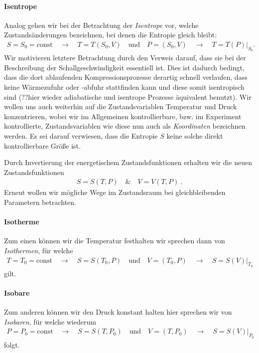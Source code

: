 \paragraph*{Isentrope}
Analog gehen wir bei der Betrachtung der \emph{Isentrope} vor, welche Zustandsänderungen bezeichnen, bei denen die Entropie gleich bleibt: 
\begin{align*}
    S=S_0=\mathrm{const}\quad\rightarrow\quad T=T(S_0,V) \quad\text{und}\quad P=(S_0,V) \quad\rightarrow\quad T=T(P)|_{S_0}.
\end{align*}
Wir motivieren letztere Betrachtung durch den Verweis darauf, dass sie bei der Beschreibung der Schallgeschwindigkeit essentiell ist. Dies ist dadurch bedingt, dass die dort ablaufenden Kompressionsprozesse derartig schnell verlaufen, dass keine Wärmezufuhr oder -abfuhr stattfinden kann und diese somit isentropisch sind (??hier wieder adiabatische und isentrope Prozesse äquivalent benutzt).
Wir wollen uns auch weiterhin auf die Zustandsvariablen Temperatur und Druck konzentrieren, wobei wir im Allgemeinen kontrollierbare, bzw. im Experiment kontrollierte, Zustandsvariablen \textendash{} wie diese \textendash{} nun auch als \emph{Koordinaten} bezeichnen werden. Es sei darauf verwiesen, dass die Entropie $S$ keine solche direkt kontrollierbare Größe ist.

Durch Invertierung der energetischem Zustandsfunktionen erhalten wir die neuen Zustandsfunktionen 
\begin{align*}
    \boxed{S=S(T,P) \quad\&\quad V=V(T,P)}\:.
\end{align*} 
Erneut wollen wir mögliche Wege im Zustandsraum bei gleichbleibenden Parametern betrachten.


\paragraph*{Isotherme}
Zum einen können wir die Temperatur festhalten \textendash{} wir sprechen dann von \emph{Isothermen}, für welche 
\begin{align*}
    T=T_0=\mathrm{const}\quad\rightarrow\quad S=S(T_0,P) \quad\text{und}\quad V=(T_0,P) \quad\rightarrow\quad S=S(V)|_{T_0}
\end{align*} 
gilt.



\paragraph*{Isobare}
Zum anderen können wir den Druck konstant halten \textendash{} hier sprechen wir von \emph{Isobaren}, für welche wiederum
\begin{align*}
    P=P_0=\mathrm{const}\quad\rightarrow\quad S=S(T,P_0) \quad\text{und}\quad V=(T,P_0) \quad\rightarrow\quad S=S(V)|_{P_0}
\end{align*}
folgt.


